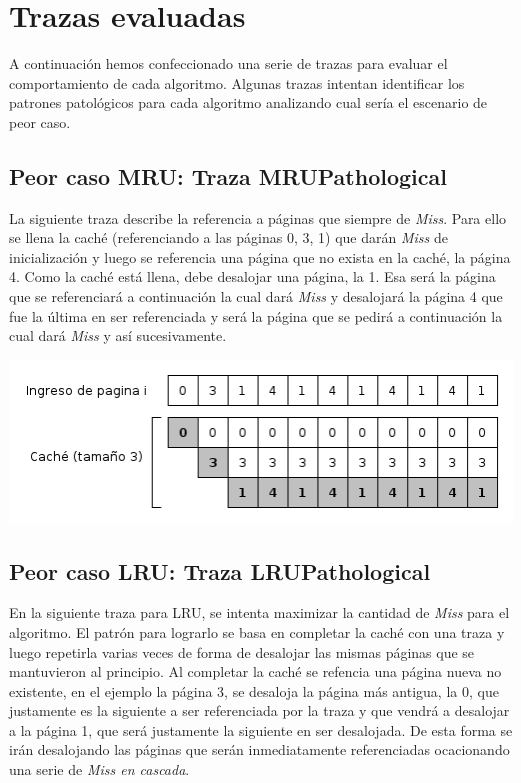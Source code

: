 \documentclass[11pt, a4paper, spanish]{article}
\begin{document}
\newpage
\section{Trazas evaluadas}

A continuaci\'on hemos confeccionado una serie de trazas para evaluar el comportamiento de cada algoritmo. Algunas trazas intentan identificar
los patrones patol\'ogicos para cada algoritmo analizando cual ser\'ia el escenario de peor caso.

\subsection{ Peor caso MRU: Traza MRUPathological}


	La siguiente traza describe la referencia a p\'aginas que siempre de \textit{Miss}. Para ello se llena la cach\'e (referenciando a las 
p\'aginas 0, 3, 1) que dar\'an \textit{Miss} de inicializaci\'on y luego se referencia una p\'agina que no exista en la cach\'e, la p\'agina 4.
Como la cach\'e est\'a llena, debe desalojar una p\'agina, la 1. Esa ser\'a la p\'agina que se referenciar\'a a continuaci\'on la cual dar\'a \textit{Miss}
y desalojar\'a la p\'agina 4 que fue la \'ultima en ser referenciada y ser\'a la p\'agina que se pedir\'a a continuaci\'on la cual dar\'a \textit{Miss} y
as\'i sucesivamente.

	\begin{center}
	\includegraphics[scale=0.65]{diagramas/MRUPathological.png}\\
	\end{center}

\subsection{ Peor caso LRU: Traza LRUPathological} 
	En la siguiente traza para LRU, se intenta maximizar la cantidad de \textit{Miss} para el algoritmo. El patr\'on para lograrlo se basa
en completar la cach\'e con una traza y luego repetirla varias veces de forma de desalojar las mismas p\'aginas que se mantuvieron al principio.
Al completar la cach\'e se refencia una p\'agina nueva no existente, en el ejemplo la p\'agina 3, se desaloja la p\'agina m\'as antigua, la 0, que 
justamente es la siguiente a ser referenciada por la traza y que vendr\'a a desalojar a la p\'agina 1, que ser\'a justamente la siguiente en ser 
desalojada. De esta forma se ir\'an desalojando las p\'aginas que ser\'an inmediatamente referenciadas ocacionando una serie de \textit{Miss en cascada}. 
\end{document}
